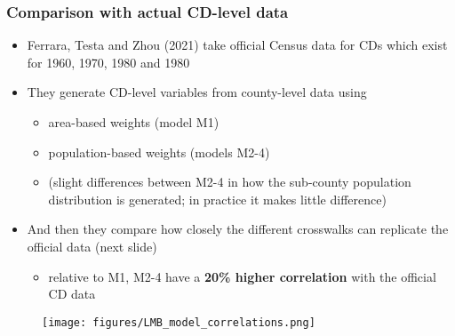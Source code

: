 \documentclass{beamer}
\begin{document}

\begin{frame}
\frametitle{Comparison with actual CD-level data}

\begin{itemize}
    \item Ferrara, Testa and Zhou (2021) take official Census data for CDs which exist for 1960, 1970, 1980 and 1980
    \item They generate CD-level variables from county-level data using
    \begin{itemize}
        \item area-based weights (model M1)
        \item population-based weights (models M2-4)
        \item (slight differences between M2-4 in how the sub-county population distribution is generated; in practice it makes little difference)
    \end{itemize}
    \item And then they compare how closely the different crosswalks can replicate the official data (next slide)
    \begin{itemize}
        \item relative to M1, M2-4 have a \textbf{20\% higher correlation} with the official CD data
    \end{itemize}
\end{itemize}

\end{frame}


\begin{frame}
\begin{figure}
    \centering
    \texttt{[image: figures/LMB\_model\_correlations.png]}
\end{figure}

\end{frame}

\end{document}
